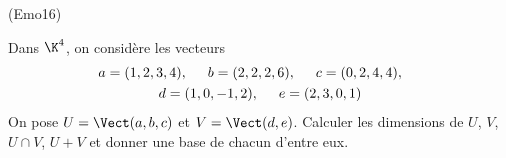 \begin{tiny}(Emo16)\end{tiny} Dans $\K^4$, on considère les vecteurs
\begin{multline*}
 a=(1,2,3,4),\hspace{0.5cm} 
 b=(2,2,2,6),\hspace{0.5cm}
 c=(0,2,4,4),\hspace{0.5cm} \\
 d=(1,0,-1,2),\hspace{0.5cm}
 e=(2,3,0,1)
\end{multline*}
On pose $U=\Vect(a,b,c)$ et $V=\Vect(d,e)$. Calculer les dimensions de $U$, $V$, $U\cap V$, $U + V$ et donner une base de chacun d'entre eux. 